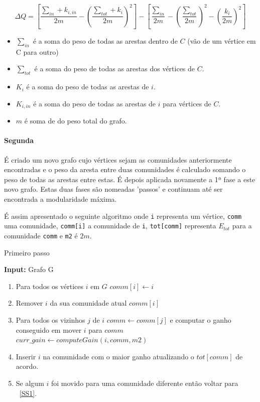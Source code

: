 \documentclass[a4paper,10pt]{report}
\renewcommand{\algorithmicrequire}{\textbf{Input: }}
\begin{document}
\begin{equation}
\label{eq:GND}
 \Delta Q  =  [\frac{\sum_{in} + k_{i,in}}{2m} - (\frac{\sum_{tot} +k_i}{2m})^2] - [\frac{\sum_{in}}{2m} - (\frac{\sum_{tot}}{2m})^2 - (\frac{k_i}{2m})^2] 
\end{equation}

\begin{itemize}
	\item $\sum_{in}$ é a soma do peso de todas as arestas dentro de $C$ (vão de um vértice em C para outro)
	\item $\sum_{tot}$ é a soma do peso de todas as arestas dos vértices de $C$. %
	\item $K_i$ é a soma do peso de todas as arestas de $i$. %
	\item $K_{i,in}$ é a soma do peso de todas as arestas de $i$ para vértices de $C$.
	\item $m$ é soma de do peso total do grafo.
\end{itemize}

\paragraph{Segunda}
É criado um novo grafo cujo vértices sejam as comunidades anteriormente encontradas e o peso da aresta entre duas comunidades é calculado somando o peso de todas as arestas entre estas. É depois aplicada novamente a 1ª fase a este novo grafo.
Estas duas fases são nomeadas 'passos' e continuam até ser encontrada a modularidade máxima.


É assim apresentado o seguinte algoritmo onde \verb|i| representa um vértice, \verb|comm| uma comunidade, \verb|comm[i]| a comunidade de \verb|i|, \verb|tot[comm]| representa $E_{tot}$ para a comunidade \verb|comm| e \verb|m2| é $2m$.
\begin{algorithm}
\caption{Primeiro passo}
\label{alg:LMPS}

	\algorithmicrequire{Grafo G}
	\begin{enumerate}
		\item Para todos os vértices $i$ em $G$ $comm[i] \gets i$
		\label{SS1}
		\item Remover $i$ da sua comunidade atual $comm[i]$
		\item Para todos os vizinhos $j$ de $i$ $comm \gets comm[j]$ e computar o ganho conseguido em mover $i$ para $comm$ $curr\_gain \gets computeGain(i,comm,m2)$
		\item Inserir $i$ na comunidade com o maior ganho atualizando o $tot[comm]$ de acordo.
		\item Se algum $i$ foi movido para uma comunidade diferente então voltar para ~\ref{SS1}.
	\end{enumerate}
\end{algorithm}
\end{document}
